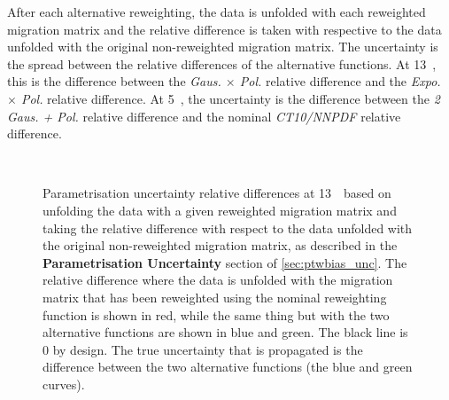 After each alternative reweighting, the data is unfolded with each reweighted migration matrix and the relative difference is taken with respective to the data unfolded with the original non-reweighted migration matrix. The uncertainty is the spread between the relative differences of the alternative functions. At 13~\TeV, this is the difference between the \textit{Gaus. $\times$ Pol.} relative difference and the \textit{Expo. $\times$ Pol.} relative difference. At 5~\TeV, the uncertainty is the difference between the \textit{2 Gaus. + Pol.} relative difference and the nominal \textit{CT10/NNPDF} relative difference.

\begin{figure}[h]
  \centering
   \\
  \caption{Parametrisation uncertainty relative differences at 13~\TeV~based on unfolding the data with a given reweighted migration matrix and taking the relative difference with respect to the data unfolded with the original non-reweighted migration matrix, as described in the \textbf{Parametrisation Uncertainty} section of \ref{sec:ptwbias_unc}. The relative difference where the data is unfolded with the migration matrix that has been reweighted using the nominal reweighting function is shown in red, while the same thing but with the two alternative functions are shown in blue and green. The black line is 0 by design. The true uncertainty that is propagated is the difference between the two alternative functions (the blue and green curves).}
  \label{fig:Wbias_unc_param13}
\end{figure}

